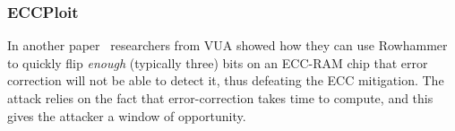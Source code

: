 \subsubsection{ECCPloit}\label{subsubsec:eccploit}
In another paper~\cite{eccploit} researchers from VUA showed how they can use Rowhammer to quickly flip \emph{enough} (typically three) bits on an ECC-RAM chip that error correction will not be able to detect it, thus defeating the ECC mitigation. The attack relies on the fact that error-correction takes time to compute, and this gives the attacker a window of opportunity.
